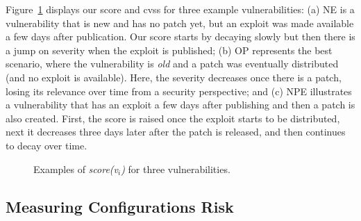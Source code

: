 Figure~\ref{fig:scoreplot} displays our score and \gls{cvss} for three example vulnerabilities:
(a) NE is a vulnerability that is new and has no patch yet, but an exploit was made available a few days after publication. 
Our score starts by decaying slowly but then there is a jump on severity when the exploit is published;
(b) OP represents the best scenario, where the vulnerability is \emph{old} and a patch was eventually distributed (and no exploit is available). 
Here, the severity decreases once there is a patch, losing its relevance over time from a security perspective; 
and (c) NPE illustrates a vulnerability that has an exploit a few days after publishing and then a patch is also created.
First, the score is raised once the exploit starts to be distributed, next it decreases three days later after the patch is released, and then continues to decay over time.


\begin{figure}[!t]
\caption{\footnotesize{Examples of \emph{score(v$_i$)} for three vulnerabilities.}}
\label{fig:scoreplot}
\end{figure}



\subsection{Measuring Configurations Risk}
\label{sec:risk}

